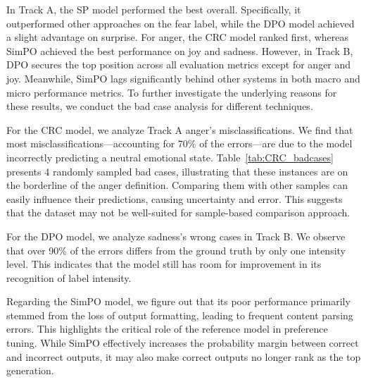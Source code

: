 \documentclass[11pt]{article}
\begin{document}
In Track A, the SP model performed the best overall. Specifically, it outperformed other approaches on the fear label, while the DPO model achieved a slight advantage on surprise. For anger, the CRC model ranked first, whereas SimPO achieved the best performance on joy and sadness. However, in Track B, DPO secures the top position across all evaluation metrics except for anger and joy. Meanwhile, SimPO lags significantly behind other systems in both macro and micro performance metrics. To further investigate the underlying reasons for these results, we conduct the bad case analysis for different techniques.


For the CRC model, we analyze Track A anger's misclassifications. We find that most misclassifications—accounting for 70\% of the errors—are due to the model incorrectly predicting a neutral emotional state. Table~\ref{tab:CRC_badcases} presents 4 randomly sampled bad cases, illustrating that these instances are on the borderline of the anger definition. Comparing them with other samples can easily influence their predictions, causing uncertainty and error. This suggests that the dataset may not be well-suited for sample-based comparison approach.

For the DPO model, we analyze sadness's wrong cases in Track B. We observe that over 90\% of the errors differs from the ground truth by only one intensity level. This indicates that the model still has room for improvement in its recognition of label intensity.

Regarding the SimPO model, we figure out that its poor performance primarily stemmed from the loss of output formatting, leading to frequent content parsing errors. This highlights the critical role of the reference model in preference tuning. While SimPO effectively increases the probability margin between correct and incorrect outputs, it may also make correct outputs no longer rank as the top generation.
\end{document}
